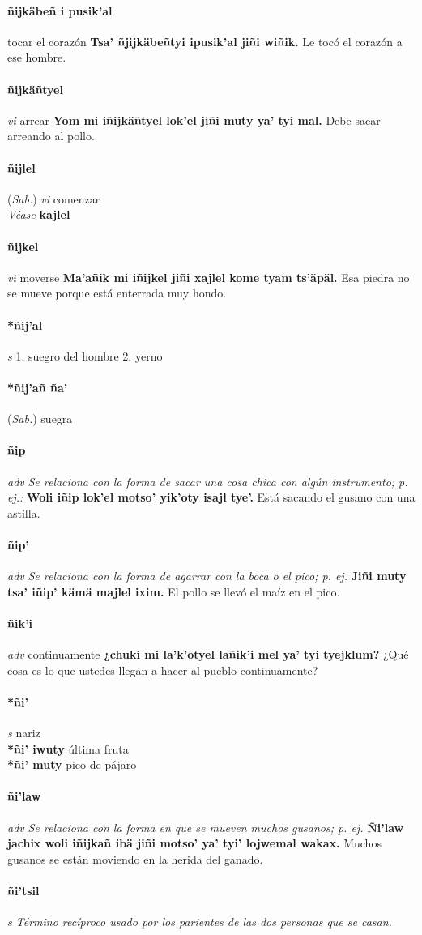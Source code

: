\documentclass{scrbook}
\newcommand{\entry}[1]{\paragraph{#1}}
\newcommand{\onedefinition}[1]{#1.}
\newcommand{\nontranslationdef}[1]{\textit{#1}}
\newcommand{\partofspeech}[1]{\textit{#1}}
\newcommand{\spanishtranslation}[1]{#1}
\newcommand{\cholexample}[1]{\textbf{#1}}
\newcommand{\exampletranslation}[1]{#1}
\newcommand{\alsosee}[1]{\\\textit{Véase} \textbf{#1}}
\newcommand{\relevantdialect}[1]{(\textit{#1})}
\newcommand{\secondaryentry}[1]{\\\textbf{#1}}
\newcommand{\secondtranslation}[1]{#1}
\begin{document}
\begin{multicols}{2}
\entry{ñijkäbeñ i pusik'al}
\spanishtranslation{tocar el corazón}
\cholexample{Tsa' ñjijkäbeñtyi ipusik'al jiñi wiñik.}
\exampletranslation{Le tocó el corazón a ese hombre.}

\entry{ñijkäñtyel}
\partofspeech{vi}
\spanishtranslation{arrear}
\cholexample{Yom mi iñijkäñtyel lok'el jiñi muty ya' tyi mal.}
\exampletranslation{Debe sacar arreando al pollo.}

\entry{ñijlel}
\relevantdialect{Sab.}
\partofspeech{vi}
\spanishtranslation{comenzar}
\alsosee{kajlel}

\entry{ñijkel}
\partofspeech{vi}
\spanishtranslation{moverse}
\cholexample{Ma'añik mi iñijkel jiñi xajlel kome tyam ts'äpäl.}
\exampletranslation{Esa piedra no se mueve porque está enterrada muy hondo.}

\entry{*ñij'al}
\partofspeech{s}
\onedefinition{1}
\spanishtranslation{suegro del hombre}
\onedefinition{2}
\spanishtranslation{yerno}

\entry{*ñij'añ ña'}
\relevantdialect{Sab.}
\spanishtranslation{suegra}

\entry{ñip}
\partofspeech{adv}
\nontranslationdef{Se relaciona con la forma de sacar una cosa chica con algún instrumento; p. ej.:}
\cholexample{Woli iñip lok'el motso' yik'oty isajl tye'.}
\exampletranslation{Está sacando el gusano con una astilla.}

\entry{ñip'}
\partofspeech{adv}
\nontranslationdef{Se relaciona con la forma de agarrar con la boca o el pico; p. ej.}
\cholexample{Jiñi muty tsa' iñip' kämä majlel ixim.}
\exampletranslation{El pollo se llevó el maíz en el pico.}

\entry{ñik'i}
\partofspeech{adv}
\spanishtranslation{continuamente}
\cholexample{¿chuki mi la'k'otyel lañik'i mel ya' tyi tyejklum?}
\exampletranslation{¿Qué cosa es lo que ustedes llegan a hacer al pueblo continuamente?}

\entry{*ñi'}
\partofspeech{s}
\spanishtranslation{nariz}
\secondaryentry{*ñi' iwuty}
\secondtranslation{última fruta}
\secondaryentry{*ñi' muty}
\secondtranslation{pico de pájaro}

\entry{ñi'law}
\partofspeech{adv}
\nontranslationdef{Se relaciona con la forma en que se mueven muchos gusanos; p. ej.}
\cholexample{Ñi'law jachix woli iñijkañ ibä jiñi motso' ya' tyi' lojwemal wakax.}
\exampletranslation{Muchos gusanos se están moviendo en la herida del ganado.}

\entry{ñi'tsil}
\partofspeech{s}
\nontranslationdef{Término recíproco usado por los parientes de las dos personas que se casan.}


\end{multicols}
\end{document}
